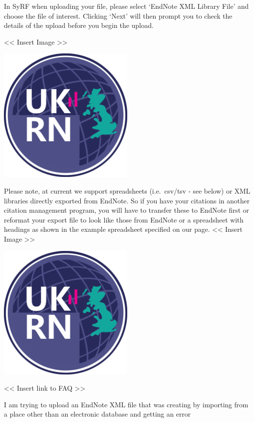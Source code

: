 \documentclass[]{book}
\begin{document}
In SyRF when uploading your file, please select `EndNote XML Library
File' and choose the file of interest. Clicking `Next' will then prompt
you to check the details of the upload before you begin the upload.

\textless{}\textless{} Insert Image \textgreater{}\textgreater{}

\includegraphics[width=0.50000\textwidth,height=0.50000\textwidth]{figs/evidence-triangle.png}

Please note, at current we support spreadsheets (i.e.~csv/tsv - see
below) or XML libraries directly exported from EndNote. So if you have
your citations in another citation management program, you will have to
transfer these to EndNote first or reformat your export file to look
like those from EndNote or a spreadsheet with headings as shown in the
example spreadsheet specified on our page. \textless{}\textless{} Insert
Image \textgreater{}\textgreater{}

\includegraphics[width=0.50000\textwidth,height=0.50000\textwidth]{figs/evidence-triangle.png}

\textless{}\textless{} Insert link to FAQ \textgreater{}\textgreater{}

I am trying to upload an EndNote XML file that was creating by importing
from a place other than an electronic database and getting an error
\end{document}
